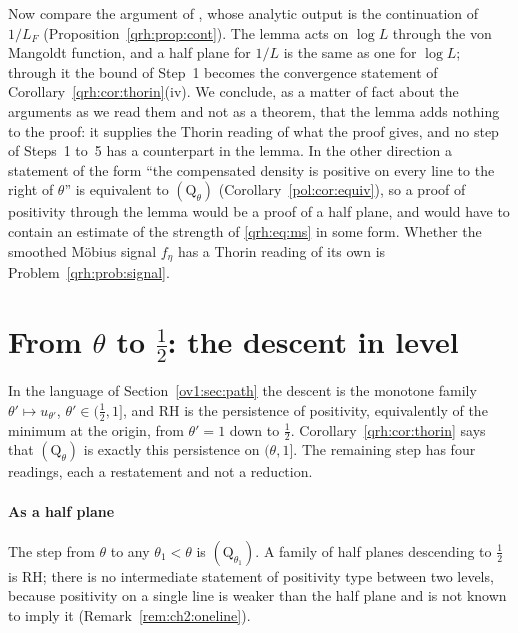 Now compare the argument of \cite{OAI26a,OAI26b}, whose analytic output is the continuation of $1/L_F$ (Proposition~\ref{qrh:prop:cont}). The lemma acts on $\log L$ through the von Mangoldt function, and a half plane for $1/L$ is the same as one for $\log L$; through it the bound of Step~1 becomes the convergence statement of Corollary~\ref{qrh:cor:thorin}(iv). We conclude, as a matter of fact about the arguments as we read them and not as a theorem, that the lemma adds nothing to the proof: it supplies the Thorin reading of what the proof gives, and no step of Steps~1 to~5 has a counterpart in the lemma. In the other direction a statement of the form ``the compensated density is positive on every line to the right of $\theta$'' is equivalent to $(\mathrm Q_\theta)$ (Corollary~\ref{pol:cor:equiv}), so a proof of positivity through the lemma would be a proof of a half plane, and would have to contain an estimate of the strength of \eqref{qrh:eq:ms} in some form. Whether the smoothed M\"obius signal $f_\eta$ has a Thorin reading of its own is Problem~\ref{qrh:prob:signal}.



\section{From $\theta$ to $\frac12$: the descent in level}\label{qrh:sec:descent}

In the language of Section~\ref{ov1:sec:path} the descent is the monotone family $\theta'\mapsto u_{\theta'}$, $\theta'\in(\frac12,1]$, and RH is the persistence of positivity, equivalently of the minimum at the origin, from $\theta'=1$ down to $\frac12$. Corollary~\ref{qrh:cor:thorin} says that $(\mathrm Q_\theta)$ is exactly this persistence on $(\theta,1]$. The remaining step has four readings, each a restatement and not a reduction.

\paragraph{As a half plane} The step from $\theta$ to any $\theta_1<\theta$ is $(\mathrm Q_{\theta_1})$. A family of half planes descending to $\frac12$ is RH; there is no intermediate statement of positivity type between two levels, because positivity on a single line is weaker than the half plane and is not known to imply it (Remark~\ref{rem:ch2:oneline}).

